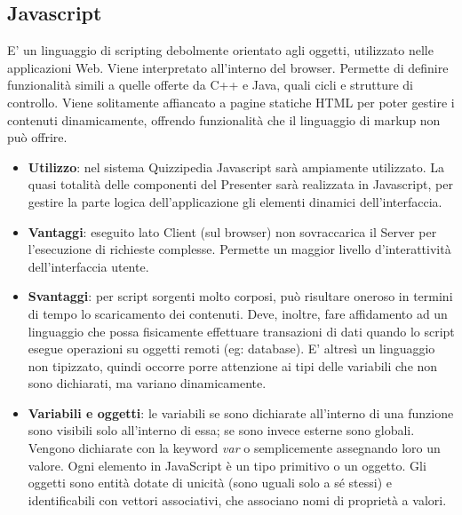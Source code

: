 \documentclass[a4paper,11pt]{article}
\begin{document}
	\subsection{Javascript}
	E' un linguaggio di scripting debolmente orientato agli oggetti, utilizzato nelle applicazioni
Web. Viene interpretato all'interno del browser. Permette di definire funzionalità simili a
quelle offerte da C++ e Java, quali cicli e strutture di controllo.
Viene solitamente affiancato a pagine statiche HTML per poter gestire i contenuti dinamicamente, offrendo funzionalità che il linguaggio di markup non può offrire.
	\begin{itemize}
		\item\textbf{Utilizzo}: nel sistema Quizzipedia Javascript sarà ampiamente utilizzato. La quasi totalità delle componenti del Presenter sarà realizzata in Javascript, per gestire la parte logica dell'applicazione gli elementi dinamici dell'interfaccia.
		\item\textbf{Vantaggi}: eseguito lato Client (sul browser) non sovraccarica il Server per l'esecuzione di richieste complesse. Permette un maggior livello d'interattività dell'interfaccia utente.
		\item\textbf{Svantaggi}: per script sorgenti molto corposi, può risultare oneroso in termini di
tempo lo scaricamento dei contenuti. Deve, inoltre, fare affidamento ad un linguaggio
che possa fisicamente effettuare transazioni di dati quando lo script esegue operazioni
su oggetti remoti (eg: database).
E' altresì un linguaggio non tipizzato, quindi occorre porre attenzione ai tipi delle
variabili che non sono dichiarati, ma variano dinamicamente.
		\item\textbf{Variabili e oggetti}: le variabili se sono dichiarate all'interno di una funzione sono
visibili solo all'interno di essa; se sono invece esterne sono globali. Vengono dichiarate
con la keyword \emph{var} o semplicemente assegnando loro un valore.
Ogni elemento in JavaScript è un tipo primitivo o un oggetto.
Gli oggetti sono entità dotate di unicità (sono uguali solo a sé stessi) e identificabili
con vettori associativi, che associano nomi di proprietà a valori.
	\end{itemize}
\end{document}
